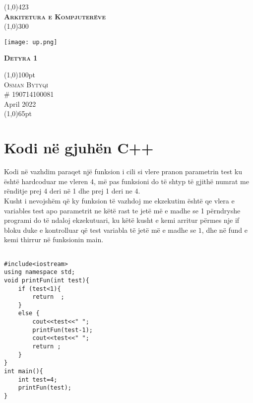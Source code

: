 \documentclass[11pt]{article}
\begin{document}
\begin{center}
\line(1,0){423}\\
[0.25in]
    \huge{\bfseries\textsc{Arkitetura e Kompjuterëve}}\\
[2mm]
\line(1,0){300}\\
[1.5cm]
\end{center}
\begin{center}
\texttt{[image: up.png]}
\end{center}
\vspace{2cm}
\begin{center}
\textsc{{\bfseries\LARGE Detyra 1}}\\
\vspace{2.3cm}
\end{center}

\begin{flushright}
\line(1,0){100pt}\\
[0.3cm]
\textsc{Osman Bytyqi}\\
\# 190714100081\\
April 2022\\
\line(1,0){65pt}\\
\end{flushright}
\newpage

\section{Kodi në gjuhën C++}

Kodi në vazhdim  paraqet një funksion i cili si vlere pranon parametrin  test ku është hardcoduar me vleren 4, më pas funksioni  do të shtyp  të gjithë numrat me rënditje prej 4 deri në 1 dhe  prej 1 deri ne 4.\\

Kusht i nevojshëm  që ky funksion të vazhdoj  me ekzekutim është qe vlera e variables  test apo parametrit  ne këtë rast te jetë më e madhe se 1 përndryshe programi do të ndaloj ekzekutuari, ku këtë kusht e kemi arritur përmes nje if bloku duke e kontrolluar që test variabla të jetë më e madhe se $1$, dhe në fund e kemi thirrur në funksionin main.
\vspace{2cm}
\begin{lstlisting}

#include<iostream>
using namespace std;
void printFun(int test){
    if (test<1){
        return  ;
    }
    else {
        cout<<test<<" ";
        printFun(test-1);
        cout<<test<<" ";
        return ;
    }
}
int main(){
    int test=4;
    printFun(test);
}


\end{lstlisting}
\newpage
\end{document}
